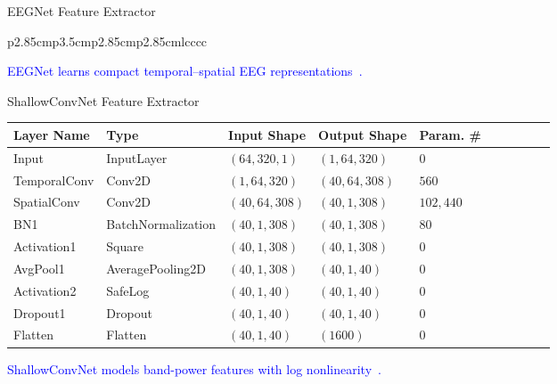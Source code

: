 \documentclass[aspectratio=169]{beamer}
\let\oldcite\cite %
\renewcommand{\cite}[1]{{\tiny\oldcite{#1}}}
\begin{document}
\begin{frame}{EEGNet Feature Extractor}
\begin{table}
\begin{tabularx}{\linewidth}{p{2.85cm}p{3.5cm}p{2.85cm}p{2.85cm}lcccc}
\end{tabularx}
\end{table}

\begin{center}
\textcolor{blue}{EEGNet learns compact temporal–spatial EEG representations~\cite{lawhern2018eegnet}.}
\end{center}
\end{frame}

\begin{frame}{ShallowConvNet Feature Extractor}

\begin{table}
\begin{tabularx}{\linewidth}{p{2.6cm}p{3.5cm}p{2.6cm}p{2.8cm}p{2.6cm}lcccc}
\toprule
\textbf{Layer Name} & \textbf{Type} & \textbf{Input Shape} & \textbf{Output Shape} & \textbf{Param. \#} \\
\midrule
Input         & InputLayer         & $(64,320,1)$   & $(1,64,320)$   & $0$ \\
TemporalConv  & Conv2D             & $(1,64,320)$   & $(40,64,308)$  & $560$ \\
SpatialConv   & Conv2D             & $(40,64,308)$  & $(40,1,308)$   & $102{,}440$ \\
BN1           & BatchNormalization & $(40,1,308)$   & $(40,1,308)$   & $80$ \\
Activation1   & Square             & $(40,1,308)$   & $(40,1,308)$   & $0$ \\
AvgPool1      & AveragePooling2D   & $(40,1,308)$   & $(40,1,40)$    & $0$ \\
Activation2   & SafeLog            & $(40,1,40)$    & $(40,1,40)$    & $0$ \\
Dropout1      & Dropout            & $(40,1,40)$    & $(40,1,40)$    & $0$ \\
Flatten       & Flatten            & $(40,1,40)$    & $(1600)$       & $0$ \\
\midrule

\end{tabularx}
\end{table}

\begin{center}
\textcolor{blue}{ShallowConvNet models band-power features with log nonlinearity~\cite{yusuf2025multi}.}
\end{center}
\end{frame}
\end{document}
